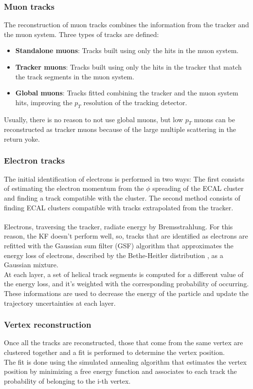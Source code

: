 \subsubsection*{Muon tracks}
The reconstruction of muon tracks combines the information from the tracker and the muon system. Three types of tracks are defined:
\begin{itemize}
    \item \textbf{Standalone muons}: Tracks built using only the hits in the muon system.
    \item \textbf{Tracker muons}: Tracks built using only the hits in the tracker that match the track segments in the muon system.
    \item \textbf{Global muons}: Tracks fitted combining the tracker and the muon system hits, improving the $p_T$ resolution of the tracking detector.
\end{itemize}
Usually, there is no reason to not use global muons, but low $p_T$ muons can be reconstructed as tracker muons because of the large multiple scattering in the return yoke. 

\subsubsection*{Electron tracks}
The initial identification of electrons is performed in two ways:
The first consists of estimating the electron momentum from the $\phi$ spreading of the ECAL cluster and finding a track compatible with the cluster.
The second method consists of finding ECAL clusters compatible with tracks extrapolated  from the tracker.\\
\\
Electrons, traversing the tracker, radiate energy by Bremsstrahlung. For this reason, the KF doesn't perform well, so, tracks that are identified as electrons are refitted with the Gaussian sum filter (GSF) algorithm \cite{Adam2003ReconstructionLHC} that approximates the energy loss of electrons, described by the Bethe-Heitler distribution \cite{Bethe1934OnElectrons}, as a Gaussian mixture.\\
At each layer, a set of helical track segments is computed for a different value of the energy loss, and it's weighted with the corresponding probability of occurring. These informations are used to decrease the energy of the particle and update the trajectory uncertainties at each layer.
\subsubsection*{Vertex reconstruction}
Once all the tracks are reconstructed, those that come from the same vertex are clustered together and a fit is performed to determine the vertex position.\\
The fit is done using the simulated annealing algorithm \cite{Kirkpatrick1983OptimizationAnnealing} that estimates the vertex position by minimizing a free energy function and associates to each track the probability of belonging to the i-th vertex. \\

